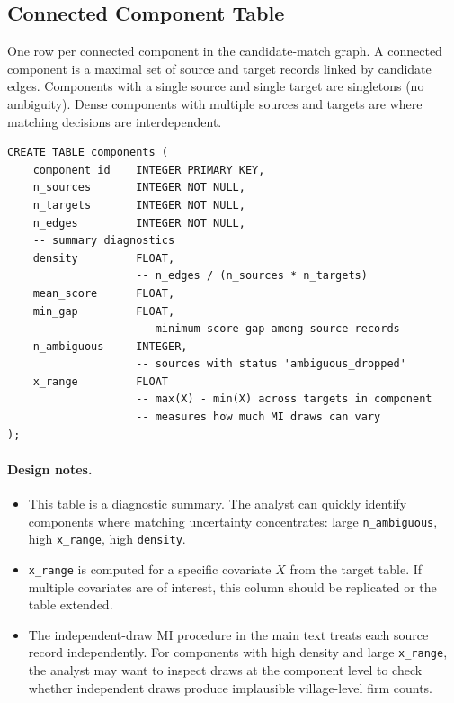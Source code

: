 \documentclass[12pt]{article}
\begin{document}
\subsection{Connected Component Table}

One row per connected component in the candidate-match graph. A connected component is a maximal set of source and target records linked by candidate edges. Components with a single source and single target are singletons (no ambiguity). Dense components with multiple sources and targets are where matching decisions are interdependent.

\begin{lstlisting}[style=sql]
CREATE TABLE components (
    component_id    INTEGER PRIMARY KEY,
    n_sources       INTEGER NOT NULL,
    n_targets       INTEGER NOT NULL,
    n_edges         INTEGER NOT NULL,
    -- summary diagnostics
    density         FLOAT,
                    -- n_edges / (n_sources * n_targets)
    mean_score      FLOAT,
    min_gap         FLOAT,
                    -- minimum score gap among source records
    n_ambiguous     INTEGER,
                    -- sources with status 'ambiguous_dropped'
    x_range         FLOAT
                    -- max(X) - min(X) across targets in component
                    -- measures how much MI draws can vary
);
\end{lstlisting}

\paragraph{Design notes.}
\begin{itemize}
    \item This table is a diagnostic summary. The analyst can quickly identify components where matching uncertainty concentrates: large \texttt{n\_ambiguous}, high \texttt{x\_range}, high \texttt{density}.
    \item \texttt{x\_range} is computed for a specific covariate $X$ from the target table. If multiple covariates are of interest, this column should be replicated or the table extended.
    \item The independent-draw MI procedure in the main text treats each source record independently. For components with high density and large \texttt{x\_range}, the analyst may want to inspect draws at the component level to check whether independent draws produce implausible village-level firm counts.
\end{itemize}
\end{document}
